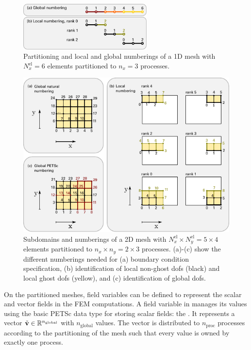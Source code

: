 \begin{figure}%
  \centering%
  \includegraphics[width=0.6\textwidth]{images/implementation/1d_nodes.pdf}%
  \caption{Partitioning and local and global numberings of a 1D mesh with $N^\text{el}_x=6$ elements partitioned to $n_x=3$ processes.}%
  \label{fig:1d_nodes}%
\end{figure}%

\begin{figure}%
  \centering%
  \includegraphics[width=\textwidth]{images/implementation/dof_numbering.pdf}%
  \caption{Subdomains and numberings of a 2D mesh with $N^\text{el}_x \times N^\text{el}_y=5\times 4$ elements partitioned to $n_x\times n_y = 2 \times 3$ processes. (a)-(c) show the different numberings needed for (a) boundary condition specification, (b) identification of local non-ghost dofs (black) and local ghost dofs (yellow), and (c) identification of global dofs.}%
  \label{fig:dof_numbering}%
\end{figure}%

\renewcommand{\Vec}{\code{Vec}}

On the partitioned meshes, field variables can be defined to represent the scalar and vector fields in the FEM computations. A field variable in \opendihu{} manages its values using the basic PETSc data type for storing scalar fields: the \emph{\Vec{}}. It represents a vector $\tilde{\textbf{v}} \in \mathbb{R}^{n_\text{global}}$ with $n_\text{global}$ values. The vector is distributed to $n_\text{proc}$ processes according to the partitioning of the mesh such that every value is owned by exactly one process. 

